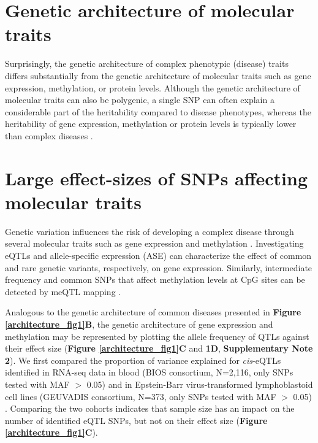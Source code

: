 \section{Genetic architecture of molecular traits}
Surprisingly, the genetic architecture of complex phenotypic (disease) traits differs substantially from the genetic architecture of molecular traits such as gene expression, methylation, or protein levels. Although the genetic architecture of molecular traits can also be polygenic, a single SNP can often explain a considerable part of the heritability compared to disease phenotypes, whereas the heritability of gene expression, methylation or protein levels is typically lower than complex diseases \cite{wrightHeritabilityGenomicsGene2014,poldermanMetaanalysisHeritabilityHuman2015}. 

\section{Large effect-sizes of SNPs affecting molecular traits}
Genetic variation influences the risk of developing a complex disease through several molecular traits such as gene expression \cite{emilssonGeneticsGeneExpression2008} and methylation \cite{conerlyInsightsRoleDNA2010}. Investigating eQTLs \cite{pickrellUnderstandingMechanismsUnderlying2010,lappalainenTranscriptomeGenomeSequencing2013,westraSystematicIdentificationTrans2013,zhernakovaIdentificationContextdependentExpression2017,gibsonExpressionQuantitativeTrait2015} and allele-specific expression (ASE) \cite{deelenCallingGenotypesPublic2015,pirinenAssessingAllelespecificExpression2015,rivasEffectPredictedProteintruncating2015,castelToolsBestPractices2015} can characterize the effect of common and rare genetic variants, respectively, on gene expression. Similarly, intermediate frequency and common SNPs that affect methylation levels at CpG sites can be detected by meQTL mapping \cite{bonderDiseaseVariantsAlter2017}.

Analogous to the genetic architecture of common diseases presented in \textbf{Figure \ref{architecture_fig1}B}, the genetic architecture of gene expression and methylation may be represented by plotting the allele frequency of QTLs against their effect size (\textbf{Figure \ref{architecture_fig1}C} and \textbf{1D}, \textbf{Supplementary Note 2}). We first compared the proportion of variance explained for \textit{cis}-eQTLs identified in RNA-seq data in blood (BIOS consortium, N=2,116, only SNPs tested with MAF $>$ 0.05) \cite{zhernakovaIdentificationContextdependentExpression2017} and in Epstein-Barr virus-transformed lymphoblastoid cell lines (GEUVADIS consortium, N=373, only SNPs tested with MAF $>$ 0.05) \cite{lappalainenTranscriptomeGenomeSequencing2013}. Comparing the two cohorts indicates that sample size has an impact on the number of identified eQTL SNPs, but not on their effect size (\textbf{Figure \ref{architecture_fig1}C}). 

